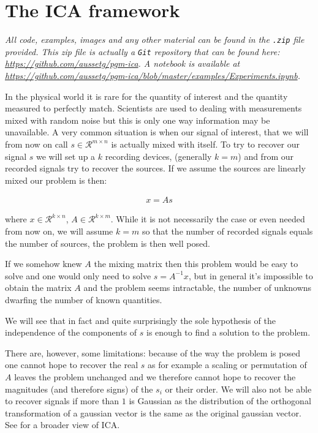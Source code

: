 \documentclass[a4paper,BCOR=5mm,oneside,openany]{scrreprt}
\begin{document}


\tableofcontents

\chapter{The ICA framework}

\emph{All code, examples, images and any other material can be found in the \texttt{.zip} file provided. This zip file is actually a \texttt{Git} repository that can be found here: \url{https://github.com/aussetg/pgm-ica}. A notebook is available at \url{https://github.com/aussetg/pgm-ica/blob/master/examples/Experiments.ipynb}.}

\vspace{1cm}

In the physical world it is rare for the quantity of interest and the quantity measured to perfectly match. Scientists are used to dealing with measurements mixed with random noise but this is only one way information may be unavailable.
A very common situation is when our signal of interest, that we will from now on call $s \in \mathcal{R}^{m \times n}$ is actually mixed with itself. To try to recover our signal $s$ we will set up a $k$ recording devices, (generally $k = m$) and from our recorded signals try to recover the sources. If we assume the sources are linearly mixed our problem is then:

\begin{align*}
	x = A s
\end{align*}

where $x \in \mathcal{R}^{k \times n}$, $A \in \mathcal{R}^{k \times m}$. While it is not necessarily the case or even needed from now on, we will assume $k = m$ so that the number of recorded signals equals the number of sources, the problem is then well posed.

If we somehow knew $A$ the mixing matrix then this problem would be easy to solve and one would only need to solve $s = A^{-1} x$, but in general it's impossible to obtain the matrix $A$ and the problem seems intractable, the number of unknowns dwarfing the number of known quantities.

We will see that in fact and quite surprisingly the sole hypothesis of the independence of the components of $s$ is enough to find a solution to the problem. 

There are, however, some limitations: because of the way the problem is posed one cannot hope to recover the real $s$ as for example a scaling or permutation of $A$ leaves the problem unchanged and we therefore cannot hope to recover the magnitudes (and therefore signs) of the $s_i$ or their order. We will also not be able to recover signals if more than $1$ is Gaussian as the distribution of the orthogonal transformation of a gaussian vector is the same as the original gaussian vector. See \cite{Hyvarinen2001} for a broader view of ICA.
\end{document}
